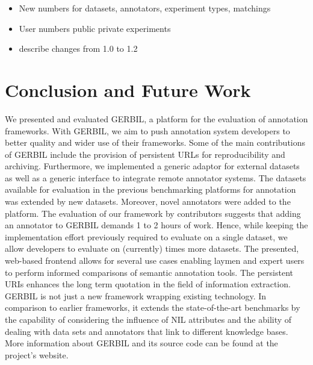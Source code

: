 \begin{itemize}
\item New numbers for datasets, annotators, experiment types, matchings
\item User numbers public private experiments
\item describe changes from 1.0 to 1.2
\end{itemize}


\section{Conclusion and Future Work}
\label{cha332:sec:conclusion}
We presented and evaluated GERBIL, a platform for the evaluation of annotation frameworks. With GERBIL, we aim to push annotation system developers to better quality and wider use of their frameworks.
Some of the main contributions of GERBIL include the provision of persistent URLs for reproducibility and archiving.
Furthermore, we implemented a generic adaptor for external datasets as well as a generic interface to integrate remote annotator systems.
The datasets available for evaluation in the previous benchmarking platforms for annotation was extended by \numberOfadditionalDatasets new datasets. Moreover, \numberOfadditionalAnnotators novel annotators were added to the platform. 
The evaluation of our framework by contributors suggests that adding an annotator to GERBIL demands 1 to 2 hours of work. Hence, while keeping the implementation effort previously required to evaluate on a single dataset, we allow developers to evaluate on (currently) \overalldatasets times more datasets.
The presented, web-based frontend allows for several use cases enabling laymen and expert users to perform informed  comparisons of semantic annotation tools.
The persistent URIs enhances the long term quotation in the field of information extraction.
GERBIL is not just a new framework wrapping existing technology. 
In comparison to earlier frameworks, it extends the state-of-the-art benchmarks by the capability of considering the influence of NIL attributes and the ability of dealing with data sets and annotators that link to different knowledge bases.
More information about GERBIL and its source code can be found at the project's website. 


